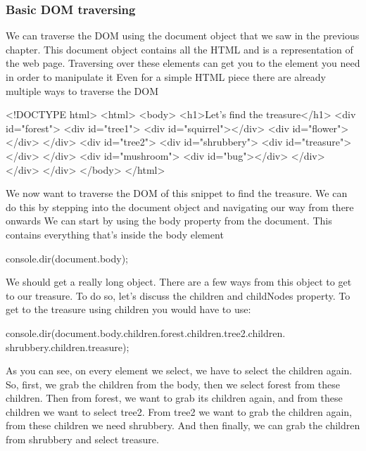 \documentclass{report}
\begin{document}
\begin{jscode}
    \subsubsection{Basic DOM traversing}
    \bigbreak \noindent
    We can traverse the DOM using the document object that we saw in the previous chapter. This document object contains all the HTML and is a representation of the web page. Traversing over these elements can get you to the element you need in order to manipulate it
    \bigbreak \noindent 
    Even for a simple HTML piece there are already multiple ways to traverse the DOM
    \bigbreak \noindent 
    \begin{htmlcode}
        <!DOCTYPE html>
        <html>
            <body>
                <h1>Let's find the treasure</h1>
                <div id="forest">
                    <div id="tree1">
                        <div id="squirrel"></div>
                        <div id="flower"></div>
                    </div>
                    <div id="tree2">
                        <div id="shrubbery">
                            <div id="treasure"></div>
                        </div>
                        <div id="mushroom">
                            <div id="bug"></div>
                        </div>
                    </div>
                </div>
            </body>
        </html>
    \end{htmlcode}
    \bigbreak \noindent 
    We now want to traverse the DOM of this snippet to find the treasure. We can do this by stepping into the document object and navigating our way from there onwards
    \bigbreak \noindent 
    We can start by using the body property from the document. This contains everything that's inside the body element
    \bigbreak \noindent 
    \begin{jscode}
    console.dir(document.body);
    \end{jscode}
    \bigbreak \noindent 
    We should get a really long object. There are a few ways from this object to get to our treasure. To do so, let's discuss the children and childNodes property.
    \bigbreak \noindent 
    To get to the treasure using children you would have to use:
    \bigbreak \noindent 
    \begin{jscode}
    console.dir(document.body.children.forest.children.tree2.children. shrubbery.children.treasure);
    \end{jscode}
    \bigbreak \noindent 
    As you can see, on every element we select, we have to select the children again. So, first, we grab the children from the body, then we select forest from these children. Then from forest, we want to grab its children again, and from these children we want to select tree2. From tree2 we want to grab the children again, from these children we need shrubbery. And then finally, we can grab the children from shrubbery and select treasure.

\end{jscode}
\end{document}
